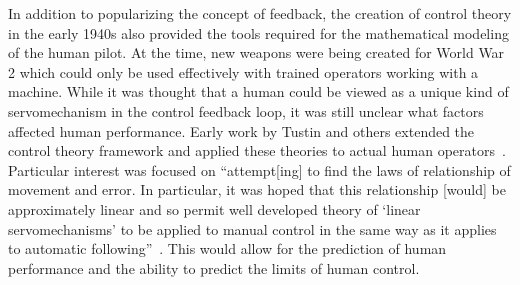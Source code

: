 In addition to popularizing the concept of feedback, the creation of control theory in the early 1940s also provided the tools required for the mathematical modeling of the human pilot.
At the time, new weapons were being created for World War 2 which could only be used effectively with trained operators working with a machine.
While it was thought that a human could be viewed as a unique kind of servomechanism in the control feedback loop, it was still unclear what factors affected human performance.
Early work by Tustin and others extended the control theory framework and applied these theories to actual human operators~\citep{tustin1944investigation}.
Particular interest was focused on ``attempt[ing] to find the laws of relationship of movement and error.
In particular, it was hoped that this relationship [would] be approximately linear and so permit well developed theory of `linear servomechanisms' to be applied to manual control in the same way as it applies to automatic following''~\citep{tustin1944investigation}.
This would allow for the prediction of human performance and the ability to predict the limits of human control.

